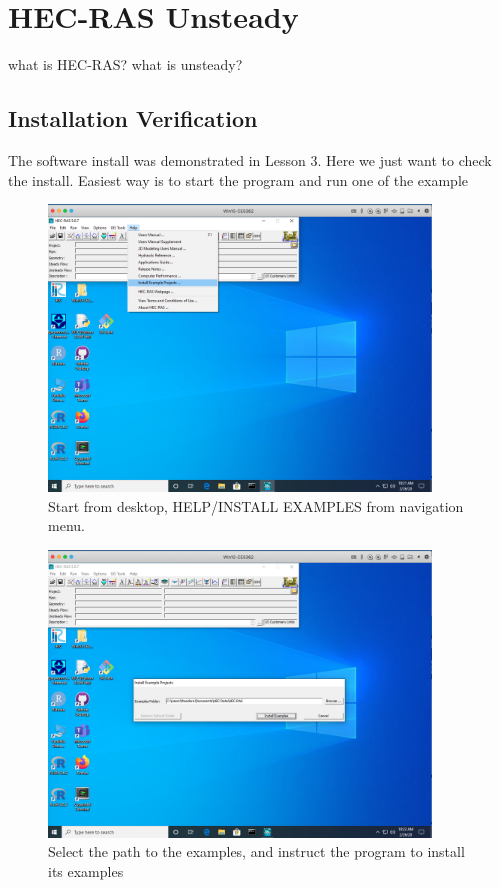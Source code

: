 \section{HEC-RAS Unsteady}
what is HEC-RAS?
what is unsteady?
\subsection{Installation Verification}
The software install was demonstrated in Lesson 3.
Here we just want to check the install.
Easiest way is to start the program and run one of the example

\begin{figure}[h!] %
   \centering
   \includegraphics[width=4in]{help-install-examples.png} 
   \caption{Start from desktop, HELP/INSTALL EXAMPLES from navigation menu.}
   \label{fig:help-install-examples}
\end{figure}



\begin{figure}[h!] %
   \centering
   \includegraphics[width=4in]{select-install-examples.png} 
   \caption{Select the path to the examples, and instruct the program to install its examples}
   \label{fig:select-install-examples}
\end{figure}



